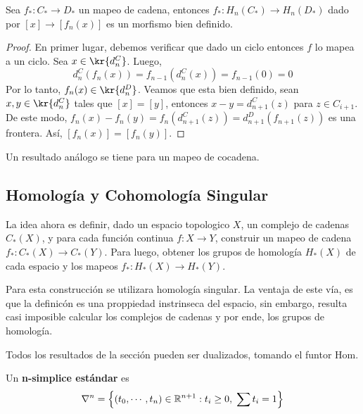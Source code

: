 \documentclass{article}
\begin{document}
\begin{lema}
    Sea $f_{*}:C_{*}\to D_{*}$ un mapeo de cadena, entonces $f_{*}:H_{n}(C_{*})\to H_{n}(D_{*})$
    dado por $[x]\to [f_{n}(x)]$ es un morfismo bien definido.
\end{lema}
\begin{proof}
    En primer lugar, debemos verificar que dado un ciclo entonces $f$ lo mapea a un ciclo. 
    Sea $x\in\kr{d_{n}^{C}}$. Luego,
    \begin{equation*}
        d_{n}^{C}(f_{n}(x))=f_{n-1}(d_{n}^{C}(x))=f_{n-1}(0)=0
    \end{equation*}
    Por lo tanto, $f_{n}(x)\in\kr{d_{n}^{D}}$. Veamos que esta bien definido, sean 
    $x,y\in\kr{d_{n}^{C}}$ tales que $[x]=[y]$, entonces $x-y=d_{n+1}^{C}(z)$ para $z\in C_{i+1}$.
    De este modo, $f_{n}(x)-f_{n}(y)=f_{n}(d_{n+1}^{C}(z))=d_{n+1}^{D}(f_{n+1}(z))$ es una 
    frontera. Así, $[f_{n}(x)]=[f_{n}(y)]$.
\end{proof}

\noindent Un resultado análogo se tiene para un mapeo de cocadena.

\subsection{Homología y Cohomología Singular}
\noindent La idea ahora es definir, dado un espacio topologico $X$, un complejo de cadenas 
$C_{*}(X)$, y para cada función continua $f:X\to Y$, construir un mapeo de cadena $f_{*}:C_{*}(X)
\to C_{*}(Y)$. Para luego, obtener los grupos de homología $H_{*}(X)$ de cada espacio y los mapeos
$f_{*}:H_{*}(X)\to H_{*}(Y)$.

\noindent Para esta construcción se utilizara homología singular. La ventaja de este vía, es que
la definicón es una proppiedad instrinseca del espacio, sin embargo, resulta casi imposible 
calcular los complejos de cadenas y por ende, los grupos de homología.

\noindent Todos los resultados de la sección pueden ser dualizados, tomando el funtor Hom.

\begin{dfn}
    Un \textbf{n-simplice estándar} es
    \begin{equation*}
        \nabla^{n}=\left\{
            (t_{0},\cdots,t_{n})\in\mathbb{R}^{n+1}:t_{i}\geq0,\hspace{1mm}\sum t_{i}=1
        \right\}
    \end{equation*}
\end{dfn}


\end{document}
